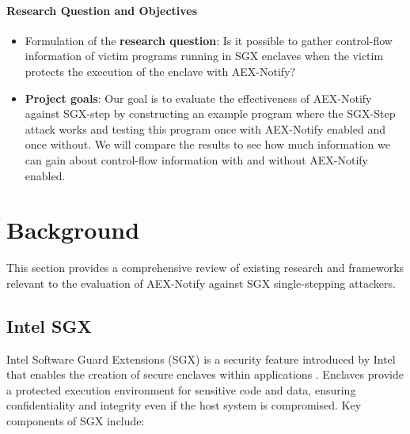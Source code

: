 \documentclass{llncs}
\begin{document}
\paragraph{Research Question and Objectives}
\begin{itemize}
  \item Formulation of the \textbf{research question}:
    Is it possible to gather control-flow information of victim programs running
    in SGX enclaves when the victim protects the execution of the enclave with
    AEX-Notify?
  \item \textbf{Project goals}:
    Our goal is to evaluate the effectiveness of AEX-Notify against SGX-step by
    constructing an example program where the SGX-Step attack works and testing
    this program once with AEX-Notify enabled and once without. We will compare
    the results to see how much information we can gain about control-flow
    information with and without AEX-Notify enabled.
\end{itemize}

\section{Background}

This section provides a comprehensive review of existing research and frameworks
relevant to the evaluation of AEX-Notify against SGX single-stepping attackers.

\subsection{Intel SGX}

Intel Software Guard Extensions (SGX) is a security feature introduced by Intel
that enables the creation of secure enclaves within applications \cite{CostanD16}.
Enclaves provide a protected execution environment for sensitive code and data,
ensuring confidentiality and integrity even if the host system is compromised.
Key components of SGX include:
\end{document}
